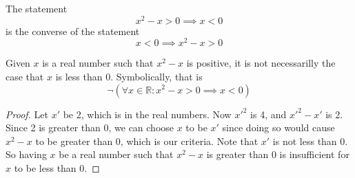 \documentclass[main.tex]{subfiles}
\begin{document}
\begin{remark}
	The statement
	\[x^2 - x > 0 \implies x < 0\]
	is the converse of the statement
	\[x < 0 \implies x^2 - x > 0\]
\end{remark}
\begin{thm}
	Given \(x\) is a real number such that \(x^2 - x\) is positive, it is
	not necessarilly the case that \(x\) is less than 0. Symbolically, that
	is
	\[\neg (\forall x \in \mathbb{R}: x^2 - x > 0 \implies x < 0)\]
\end{thm}
\begin{proof}
	Let \(x'\) be 2, which is in the real numbers. Now \(x'^2\) is 4, and
	\(x'^2 - x'\) is 2. Since 2 is greater than 0, we can choose \(x\) to be
	\(x'\) since doing so would cause \(x^2 - x\) to be greater than 0,
	which is our criteria. Note that \(x'\) is not less than 0. So having
	\(x\) be a real number such that \(x^2 - x\) is greater than 0 is
	insufficient for \(x\) to be less than 0.
\end{proof}
\end{document}
